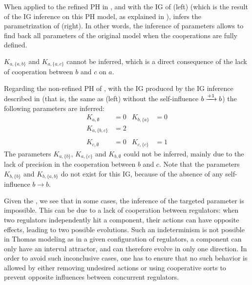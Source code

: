 \begin{example}
\label{ex:infer-param-runningPH-1}
When applied to the refined PH in ,
and with the IG of (left)
(which is the result of the IG inference on this PH model,
as explained in ),
 infers the parametrization of (right).
In other words, the inference of parameters allows to find back all parameters
of the original model when the cooperations are fully defined.
\end{example}

$K_{a,\{a,b\}}$ and $K_{a,\{a,c\}}$ cannot be inferred,
which is a direct consequence of the lack of cooperation between $b$ and $c$ on $a$.

\begin{example}
Regarding the non-refined PH of ,
with the IG produced by the IG inference described in 
(that is, the same as (left)
without the self-influence $b \xrightarrow{+ 1} b$)
the following parameters are inferred:
\begin{align*}
  K_{a,\emptyset} &= 0 &
  K_{b,\{a\}} &= 0 \\
  K_{a,\{b,c\}} &= 2 \\ \\
  K_{c,\emptyset} &= 0 &
  K_{c,\{c\}} &= 1
\end{align*}
The parameters $K_{a,\{b\}}$, $K_{a,\{c\}}$ and $K_{b,\emptyset}$
could not be inferred,
mainly due to the lack of precision in the cooperation between $b$ and $c$.
Note that the parameters $K_{b,\{b\}}$ and $K_{b,\{a,b\}}$ do not exist for this IG,
because of the absence of any self-influence $b \rightarrow b$.
\end{example}

Given the , we see that in some cases, the inference of the targeted parameter is impossible.
This can be due to a lack of cooperation between regulators:
when two regulators independently hit a component, their actions can have opposite effects, leading to two possible evolutions.
Such an indeterminism is not possible in Thomas modeling as in a given configuration of regulators,
a component can only have an interval attractor, and can therefore evolve in only one direction.
In order to avoid such inconclusive cases, one has to ensure that no such behavior is allowed by
either removing undesired actions or using cooperative sorts to prevent opposite influences between
concurrent regulators.

